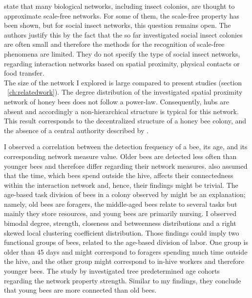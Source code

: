 \textcite{charbonneau2013social} state that many biological networks, including insect colonies, are thought to approximate scale-free networks.
For some of them, the scale-free property has been shown, but for social insect networks, this question remains open.
The authors justify this by the fact that the so far investigated social insect colonies are often small and therefore the methods for the recognition of scale-free phenomena are limited.
They do not specify the type of social insect networks, regarding interaction networks based on spatial proximity, physical contacts or food transfer.\\
The size of the network I explored is large compared to present studies (section ~\ref{ch:relatedwork}). The degree distribution of the investigated spatial proximity network of honey bees does not follow a power-law. Consequently, hubs are absent and accordingly a non-hierarchical structure is typical for this network. This result
corresponds to the decentralized structure of a honey bee colony, and the absence of a central authority described by \textcite{seeley1989honey}.


I observed a correlation between the detection frequency of a bee, its age, and its corresponding network measure value. Older bees are detected less often than younger bees and therefore differ regarding their network measures.
\textcite{baracchi2014socio} also assumed that the time, which bees spend outside the hive, affects their connectedness within the interaction network and, hence, their findings might be trivial.
The age-based task division of bees in a colony observed by \textcite{seeley1989social} might be an explanation; namely, old bees are foragers, the middle-aged bees relate to several tasks but mainly they store resources, and young bees are primarily nursing. I observed bimodal degree, strength, closeness and betweenness distributions and a right skewed local clustering coefficient distribution. Those findings could imply two functional groups of bees, related to the age-based division of labor. One group is older than 45 days and might correspond to foragers spending much time outside the hive, and the other group might correspond to in-hive workers and therefore younger bees. The study by \textcite{baracchi2014socio} investigated tree predetermined age cohorts regarding the network property strength. Similar to my findings, they conclude that young bees are more connected than old bees.


